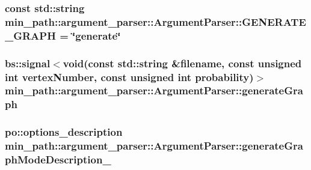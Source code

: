 \subsubsection[{\texorpdfstring{G\+E\+N\+E\+R\+A\+T\+E\+\_\+\+G\+R\+A\+PH}{GENERATE_GRAPH}}]{\setlength{\rightskip}{0pt plus 5cm}const std\+::string min\+\_\+path\+::argument\+\_\+parser\+::\+Argument\+Parser\+::\+G\+E\+N\+E\+R\+A\+T\+E\+\_\+\+G\+R\+A\+PH = \char`\"{}generate\char`\"{}}\hypertarget{a00002_a4b56bd44886c90debd323f54761489a6_a4b56bd44886c90debd323f54761489a6}{}\label{a00002_a4b56bd44886c90debd323f54761489a6_a4b56bd44886c90debd323f54761489a6}
\subsubsection[{\texorpdfstring{generate\+Graph}{generateGraph}}]{\setlength{\rightskip}{0pt plus 5cm}bs\+::signal$<$void(const std\+::string \&filename, const unsigned int vertex\+Number, const unsigned int probability)$>$ min\+\_\+path\+::argument\+\_\+parser\+::\+Argument\+Parser\+::generate\+Graph}\hypertarget{a00002_a5a6e6dd3ac7502d0269b2756383f1923_a5a6e6dd3ac7502d0269b2756383f1923}{}\label{a00002_a5a6e6dd3ac7502d0269b2756383f1923_a5a6e6dd3ac7502d0269b2756383f1923}
\subsubsection[{\texorpdfstring{generate\+Graph\+Mode\+Description\+\_\+}{generateGraphModeDescription_}}]{\setlength{\rightskip}{0pt plus 5cm}po\+::options\+\_\+description min\+\_\+path\+::argument\+\_\+parser\+::\+Argument\+Parser\+::generate\+Graph\+Mode\+Description\+\_\+\hspace{0.3cm}{\ttfamily [private]}}\hypertarget{a00002_aaa15954a88f93131e4c17223eafc11c5_aaa15954a88f93131e4c17223eafc11c5}{}\label{a00002_aaa15954a88f93131e4c17223eafc11c5_aaa15954a88f93131e4c17223eafc11c5}


